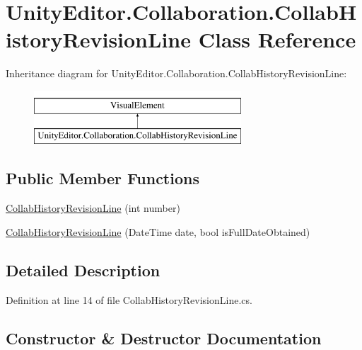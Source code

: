\hypertarget{class_unity_editor_1_1_collaboration_1_1_collab_history_revision_line}{}\section{Unity\+Editor.\+Collaboration.\+Collab\+History\+Revision\+Line Class Reference}
\label{class_unity_editor_1_1_collaboration_1_1_collab_history_revision_line}
Inheritance diagram for Unity\+Editor.\+Collaboration.\+Collab\+History\+Revision\+Line\+:\begin{figure}[H]
\begin{center}
\leavevmode
\includegraphics[height=2.000000cm]{class_unity_editor_1_1_collaboration_1_1_collab_history_revision_line}
\end{center}
\end{figure}
\subsection*{Public Member Functions}
\begin{DoxyCompactItemize}
\item 
\mbox{\hyperlink{class_unity_editor_1_1_collaboration_1_1_collab_history_revision_line_a236b3b21a20674ed2917b211f07b7f49}{Collab\+History\+Revision\+Line}} (int number)
\item 
\mbox{\hyperlink{class_unity_editor_1_1_collaboration_1_1_collab_history_revision_line_a416e1856e8801c573dbb05a2e16033d1}{Collab\+History\+Revision\+Line}} (Date\+Time date, bool is\+Full\+Date\+Obtained)
\end{DoxyCompactItemize}


\subsection{Detailed Description}


Definition at line 14 of file Collab\+History\+Revision\+Line.\+cs.



\subsection{Constructor \& Destructor Documentation}
\mbox{\label{class_unity_editor_1_1_collaboration_1_1_collab_history_revision_line_a236b3b21a20674ed2917b211f07b7f49}} 
